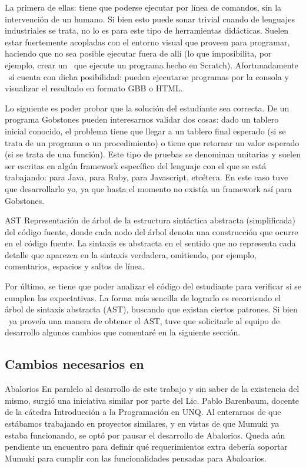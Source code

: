 La primera de ellas: tiene que poderse ejecutar por línea de comandos, sin la intervención de un humano. Si bien esto puede sonar trivial cuando de lenguajes industriales se trata, no lo es para este tipo de herramientas didácticas. Suelen estar fuertemente acopladas con el entorno visual que proveen para programar, haciendo que no sea posible ejecutar fuera de allí (lo que imposibilita, por ejemplo, crear un \runner\ que ejecute un programa hecho en Scratch). Afortunadamente \pyGob\ sí cuenta con dicha posibilidad: pueden ejecutarse programas por la consola y visualizar el resultado en formato GBB o HTML.

Lo siguiente es poder probar que la solución del estudiante sea correcta. De un programa Gobstones pueden interesarnos validar dos cosas: dado un tablero inicial conocido, el problema tiene que llegar a un tablero final esperado (si se trata de un programa o un procedimiento) o tiene que retornar un valor esperado (si se trata de una función). Este tipo de pruebas se denominan unitarias y suelen ser escritas en algún framework específico del lenguaje con el que se está trabajando:  para Java,  para Ruby,  para Javascript, etcétera. En este caso tuve que desarrollarlo yo, ya que hasta el momento no existía un framework así para Gobstones.

\sepfootnotecontent
  {AST}
  {Representación de árbol de la estructura sintáctica abstracta (simplificada) del código fuente, donde cada nodo del árbol denota una construcción que ocurre en el código fuente. La sintaxis es abstracta en el sentido que no representa cada detalle que aparezca en la sintaxis verdadera, omitiendo, por ejemplo, comentarios, espacios y saltos de línea.}

Por último, se tiene que poder analizar el código del estudiante para verificar si se cumplen las expectativas. La forma más sencilla de lograrlo es recorriendo el árbol de sintaxis abstracta (AST), buscando que existan ciertos patrones. Si bien \pyGob\ ya proveía una manera de obtener el AST, tuve que solicitarle al equipo de desarrollo algunos cambios que comentaré en la siguiente sección.

\subsection{Cambios necesarios en \pyGob}
\sepfootnotecontent
  {Abalorios}
  {En paralelo al desarrollo de este trabajo y sin saber de la existencia del mismo, surgió una iniciativa similar por parte del Lic. Pablo Barenbaum, docente de la cátedra Introducción a la Programación en UNQ. Al enterarnos de que estábamos trabajando en proyectos similares, y en vistas de que Mumuki ya estaba funcionando, se optó por pausar el desarrollo de Abalorios. Queda aún pendiente un encuentro para definir qué requerimientos extra debería soportar Mumuki para cumplir con las funcionalidades pensadas para Abaloarios.}

